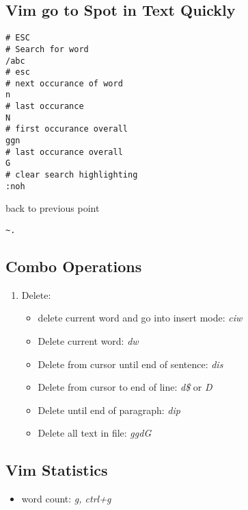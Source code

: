 \documentclass[]{article}
\providecommand{\tightlist}{%
  \setlength{\itemsep}{0pt}\setlength{\parskip}{0pt}}
\begin{document}
\hypertarget{vim-go-to-spot-in-text-quickly}{%
\subsection{Vim go to Spot in Text
Quickly}\label{vim-go-to-spot-in-text-quickly}}

\begin{verbatim}
# ESC
# Search for word
/abc
# esc
# next occurance of word
n
# last occurance
N
# first occurance overall
ggn
# last occurance overall
G
# clear search highlighting
:noh
\end{verbatim}

back to previous point

\begin{verbatim}
~.
\end{verbatim}

\hypertarget{combo-operations}{%
\subsection{Combo Operations}\label{combo-operations}}

\begin{enumerate}
\def\labelenumi{\arabic{enumi}.}
\tightlist
\item
  Delete:

  \begin{itemize}
  \tightlist
  \item
    delete current word and go into insert mode: \emph{ciw}
  \item
    Delete current word: \emph{dw}
  \item
    Delete from cursor until end of sentence: \emph{dis}
  \item
    Delete from cursor to end of line: \emph{d\$} or \emph{D}
  \item
    Delete until end of paragraph: \emph{dip}
  \item
    Delete all text in file: \emph{ggdG}
  \end{itemize}
\end{enumerate}

\hypertarget{vim-statistics}{%
\subsection{Vim Statistics}\label{vim-statistics}}

\begin{itemize}
\tightlist
\item
  word count: \emph{g, ctrl+g}
\end{itemize}
\end{document}
